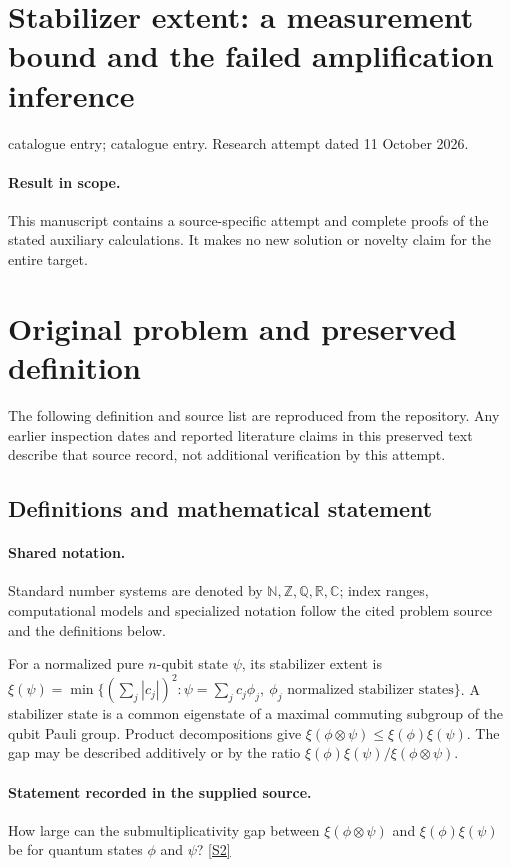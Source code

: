 \documentclass[11pt]{article}
\begin{document}
\section*{Stabilizer extent: a measurement bound and the failed amplification inference}
\noindent catalogue entry; catalogue entry. Research attempt dated 11 October 2026.
\paragraph{Result in scope.}This manuscript contains a source-specific attempt and complete proofs of the stated auxiliary calculations. It makes no new solution or novelty claim for the entire target.
\section{Original problem and preserved definition}
The following definition and source list are reproduced from the repository. Any earlier inspection dates and reported literature claims in this preserved text describe that source record, not additional verification by this attempt.
\subsection{Definitions and mathematical statement}

\paragraph{Shared notation.}Standard number systems are denoted by $\mathbb N,\mathbb Z,\mathbb Q,\mathbb R,\mathbb C$; index ranges, computational models and specialized notation follow the cited problem source and the definitions below.


For a normalized pure $n$-qubit state $\psi$, its stabilizer extent is $\xi(\psi)=\min\{(\sum_j|c_j|)^2:\psi=\sum_jc_j\phi_j,\ \phi_j\text{ normalized stabilizer states}\}$. A stabilizer state is a common eigenstate of a maximal commuting subgroup of the qubit Pauli group. Product decompositions give $\xi(\phi\otimes\psi)\leq\xi(\phi)\xi(\psi)$. The gap may be described additively or by the ratio $\xi(\phi)\xi(\psi)/\xi(\phi\otimes\psi)$.
\paragraph{Statement recorded in the supplied source.}
How large can the submultiplicativity gap between $\xi(\phi\otimes\psi)$ and $\xi(\phi)\xi(\psi)$ be for quantum states $\phi$ and $\psi$? \href{https://doi.org/10.4171/owr/2021/49}{[S2]}
\end{document}
